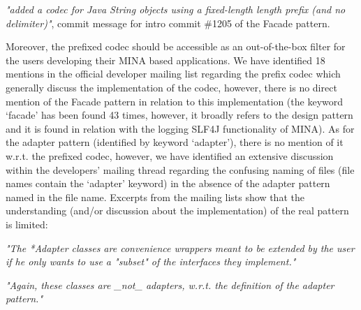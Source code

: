 \textit{"added a codec for Java String objects using a fixed-length length prefix (and no delimiter)"}, commit message for intro commit \#1205 of the Facade pattern.

Moreover, the prefixed codec should be accessible as an out-of-the-box filter for the users developing their MINA based applications. We have identified 18 mentions in the official developer mailing list \cite{mina-mail} regarding the prefix codec which generally discuss the implementation of the codec, however, there is no direct mention of the Facade pattern in relation to this implementation (the keyword `facade' has been found 43 times, however, it broadly refers to the design pattern and it is found in relation with the logging SLF4J \cite{slf4j} functionality of MINA). As for the adapter pattern (identified by keyword `adapter'), there is no mention of it w.r.t. the prefixed codec, however, we have identified an extensive discussion within the developers' mailing thread regarding the confusing naming of files (file names contain the `adapter' keyword) in the absence of the adapter pattern named in the file name. Excerpts from the mailing lists show that the understanding (and/or discussion about the implementation) of the real pattern is limited:

\textit{"The *Adapter classes are convenience wrappers meant to be extended by the user if he only wants to use a "subset" of the interfaces they implement."}

\textit{"Again, these classes are \_not\_ adapters, w.r.t. the definition of the 
adapter pattern."}

